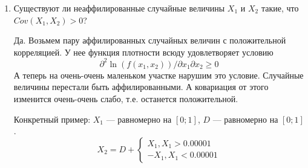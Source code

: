 \begin{enumerate}
\item Существуют ли неаффилированные случайные величины $ X_{1} $ и $ X_{2} $ такие, что $Cov(X_{1},X_{2})>0  $?


Да. Возьмем пару аффилированных случайных величин с положительной корреляцией. У нее функция плотности всюду удовлетворяет условию 
\begin{equation}
\partial^{2}\ln (f(x_{1},x_{2}))/\partial x_{1}\partial x_{2} \geq 0
\end{equation}
А теперь на очень-очень маленьком участке нарушим это условие. Случайные величины перестали быть аффилированными. А ковариация от этого изменится очень-очень слабо, т.е. останется положительной.

Конкретный пример: $ X_{1} $ ---  равномерно на $ [0;1] $, $ D $ --- равномерно на $ [0;1] $. 
\begin{equation}
X_{2}=D+
\begin{cases}
X_{1}, X_{1}>0.00001 \\
-X_{1}, X_{1}<0.00001
\end{cases}
\end{equation} 


\end{enumerate}
